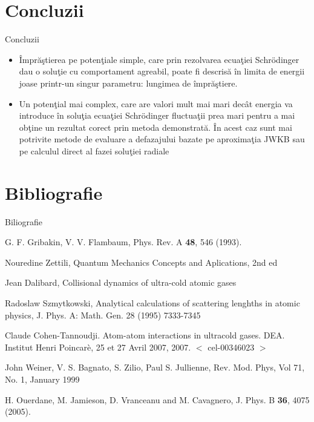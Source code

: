 \section{Concluzii}
\begin{frame}[allowframebreaks]{Concluzii}

\begin{itemize}
\item \^{I}mpr\u{a}\c{s}tierea pe poten\c{t}iale simple, care prin rezolvarea ecua\c{t}iei Schr\"{o}dinger dau o solu\c{t}ie cu comportament agreabil, poate fi descris\u{a} \^{i}n limita de energii joase printr-un singur parametru: lungimea de \^{i}mpr\u{a}\c{s}tiere.
\item Un poten\c{t}ial mai complex, care are valori mult mai mari dec\^{a}t energia va introduce \^{i}n solu\c{t}ia ecua\c{t}iei Schr\"{o}dinger fluctua\c{t}ii prea mari pentru a mai ob\c{t}ine un rezultat corect prin metoda demonstrat\u{a}. \^{I}n acest caz sunt mai potrivite metode de evaluare a defazajului bazate pe aproxima\c tia JWKB sau pe calculul direct al fazei solu\c tiei radiale
\end{itemize}

\end{frame}

\section{Bibliografie}
\begin{frame}[allowframebreaks]{Biliografie}
\begin{thebibliography}{1000}
G. F. Gribakin, V. V. Flambaum, Phys. Rev. A {\bf 48}, 546 (1993).

Nouredine Zettili, Quantum Mechanics Concepts and Aplications, 2nd ed

Jean Dalibard, Collisional dynamics of ultra-cold atomic gases

Radoslaw Szmytkowski, Analytical calculations of scattering lenghths in atomic physics, J. Phys. A: Math. Gen. 28 (1995) 7333-7345
  
Claude Cohen-Tannoudji. Atom-atom interactions in ultracold gases. DEA. Institut Henri Poincar\`{e}, 25 et 27 Avril 2007, 2007. $<$ cel-00346023 $>$

John Weiner, V. S. Bagnato, S. Zilio, Paul S. Jullienne, Rev. Mod. Phys, Vol 71, No. 1, January 1999

H. Ouerdane, M. Jamieson, D. Vranceanu and M. Cavagnero, J. Phys. B  {\bf 36}, 4075 (2005).
\end{thebibliography}
\end{frame}


